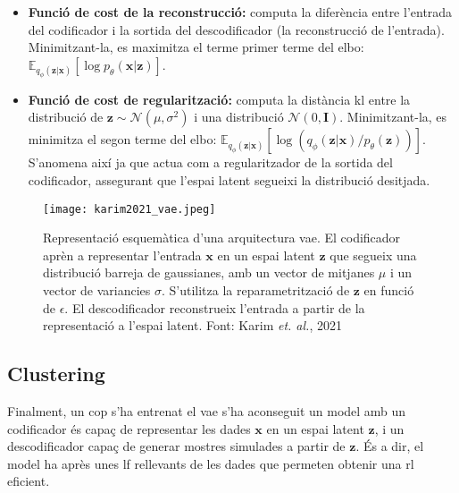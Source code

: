 \documentclass[CAT,BIB]{TFUOC}%
\begin{document}
        \begin{itemize}
            \item \textbf{Funció de cost de la reconstrucció:}
            computa la diferència entre l'entrada del codificador
            i la sortida del descodificador
            (la reconstrucció de l'entrada).
            Minimitzant-la, es maximitza el terme primer terme del \gls{elbo}:
            $\mathbb{E}_{q_\phi(\mathbf{z|x})} [ \log p_\theta(\mathbf{x|z}) ]$.

            \item \textbf{Funció de cost de regularització:}
            computa la distància \gls{kl}
            entre la distribució de $\mathbf{z} \sim \mathcal{N}(\mu, \sigma^2)$
            i una distribució $\mathcal{N}(0, \mathbf{I})$.
            Minimitzant-la, es minimitza el segon terme del \gls{elbo}:
            $\mathbb{E}_{q_\phi(\mathbf{z|x})} [ \log ( q_\phi(\mathbf{z|x}) / p_\theta(\mathbf{z}) ) ]$.
            S'anomena així ja que actua com a regularitzador
            de la sortida del codificador,
            assegurant que l'espai latent segueixi la distribució desitjada.
        \end{itemize}

        \begin{figure}
            \centering
            \texttt{[image: karim2021\_vae.jpeg]}
            \caption{
                Representació esquemàtica d'una arquitectura \gls{vae}.
                El codificador aprèn a representar l'entrada $\mathbf{x}$
                en un espai latent $\mathbf{z}$
                que segueix una distribució barreja de gaussianes,
                amb un vector de mitjanes $\mu$ i un vector de variancies $\sigma$.
                S'utilitza la reparametrització de $\mathbf{z}$ en funció de $\epsilon$.
                El descodificador reconstrueix l'entrada
                a partir de la representació a l'espai latent.
                Font: Karim \textit{et. al.}, 2021 \citep{Karim2021}
            }
            \label{fig:vae_min}
        \end{figure}



    \subsection{Clustering}
    \label{s:clustering}

        Finalment, un cop s'ha entrenat el \gls{vae}
        s'ha aconseguit un model amb un codificador
        és capaç de representar les dades $\mathbf{x}$ en un espai latent $\mathbf{z}$,
        i un descodificador capaç de generar mostres simulades
        a partir de $\mathbf{z}$.
        És a dir, el model ha après unes \gls{lf} rellevants de les dades
        que permeten obtenir una \gls{rl} eficient.
\end{document}
